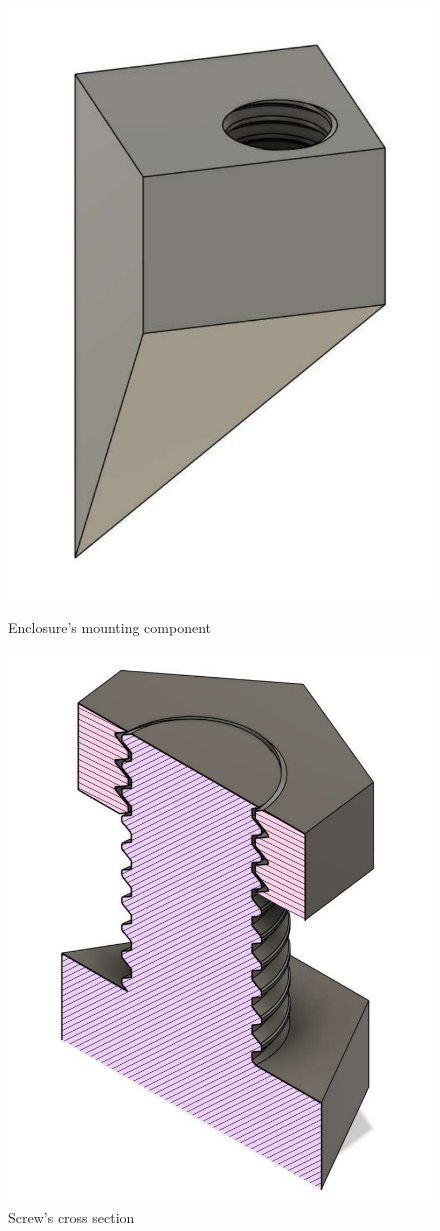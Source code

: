 \begin{figure}[h]
    \centering
    \begin{minipage}[b]{0.49\textwidth}
        \centering
        \includegraphics[width=.7\textwidth]{Imagenes/Vectorial/enclosure_mounting.pdf}
        \caption{Enclosure's mounting component}
        \label{fig:enclosure_mounting}
    \end{minipage}
    \hfill
    \begin{minipage}[b]{0.49\textwidth}
        \centering
        \includegraphics[width=.7\textwidth]{Imagenes/Vectorial/screw_cross_section.pdf}
        \caption{Screw's cross section}
        \label{fig:screw_cross_section}
    \end{minipage}
\end{figure}

